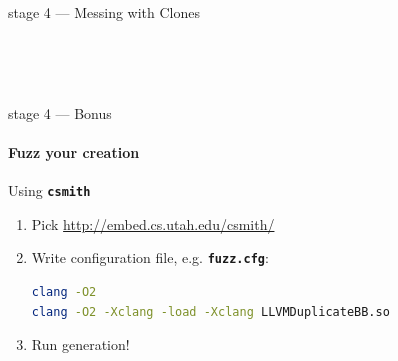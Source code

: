 \documentclass[14pt]{beamer}
\newcommand{\Command}[1]{\textbf{\texttt{#1}}}
\begin{document}
    \begin{frame}[containsverbatim]{stage 4 --- Messing with Clones}
        \\
        \hspace{-2em}%
        \begin{minipage}{\textwidth}
        \scriptsize
        
        \end{minipage}

        \\
        \hspace{-2em}%
        \begin{minipage}{\textwidth}
        \scriptsize
        
        \end{minipage}

        \\
        \hspace{-2em}%
        \begin{minipage}{\textwidth}
        \scriptsize
        
        \end{minipage}

    \end{frame}

    \begin{frame}[containsverbatim]{stage 4 --- Bonus}
        \framesubtitle{Fuzz your creation}
        \begin{alertblock}{Using \Command{csmith}}
            \begin{enumerate}
                \item Pick \url{http://embed.cs.utah.edu/csmith/}
                \item Write configuration file, e.g. \Command{fuzz.cfg}:
                    {
                        \scriptsize
\begin{lstlisting}[language=bash]
clang -O2
clang -O2 -Xclang -load -Xclang LLVMDuplicateBB.so
\end{lstlisting}
                    }
                \item Run generation!
                    {
                        \scriptsize
\begin{lstlisting}[language=bash]
% CSMITH_HOME=$PWD ./scripts/compiler_test.pl 1000 fuzz.cfg
\end{lstlisting}
                    }
            \end{enumerate}
        \end{alertblock}
    \end{frame}
\end{document}

